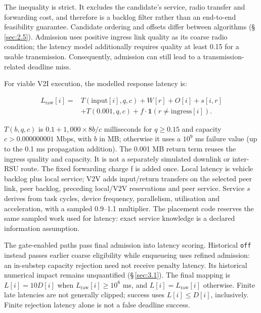 \documentclass[11pt,a4paper]{article}
\begin{document}
The inequality is strict. It excludes the candidate's service, radio transfer and forwarding cost, and therefore is a backlog filter rather than an end-to-end feasibility guarantee. Candidate ordering and offsets differ between algorithms (\S\,\ref{sec:2.5}). Admission uses positive ingress link quality as its coarse radio condition; the latency model additionally requires quality at least 0.15 for a usable transmission. Consequently, admission can still lead to a transmission-related deadline miss.

For viable V2I execution, the modelled response latency is:

\begin{equation}\label{eq:4}
 \begin{aligned}
 L_{\mathrm{raw}}[i]={}&T(\mathrm{input}[i],q,c)+W[r]+O[i]+s[i,r]\\
 &+T(0.001,q,c)+f\cdot\mathbf{1}(r\neq\mathrm{ingress}[i]).
 \end{aligned}
\end{equation}

$T(b,q,c)$ is $0.1 + 1{,}000 \times 8b/c$ milliseconds for $q\geq 0.15$ and capacity $c>0.000000001$ Mbps, with $b$ in MB; otherwise it uses a $10^{9}$ ms failure value (up to the 0.1 ms propagation addition). The 0.001 MB return term reuses the ingress quality and capacity. It is not a separately simulated downlink or inter-RSU route. The fixed forwarding charge f is added once. Local latency is vehicle backlog plus local service; V2V adds input/return transfers on the selected peer link, peer backlog, preceding local/V2V reservations and peer service. Service $s$ derives from task cycles, device frequency, parallelism, utilisation and acceleration, with a sampled 0.9--1.1 multiplier. The placement code reserves the same sampled work used for latency: exact service knowledge is a declared information assumption.

The gate-enabled paths pass final admission into latency scoring. Historical \texttt{off} instead passes earlier coarse eligibility while enqueueing uses refined admission: an in-substep capacity rejection need not receive penalty latency. Its historical numerical impact remains unquantified (\S\,\ref{sec:3.1}). The final mapping is $L[i]=10D[i]$ when $L_{\mathrm{raw}}[i]\geq 10^{8}$ ms, and $L[i]=L_{\mathrm{raw}}[i]$ otherwise. Finite late latencies are not generally clipped; success uses $L[i]\leq D[i]$, inclusively. Finite rejection latency alone is not a false deadline success.
\end{document}
